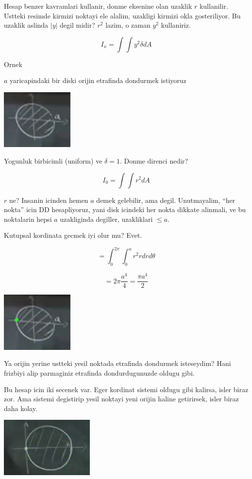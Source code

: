 \documentclass[12pt,fleqn]{article}\usepackage{../common}
\begin{document}
Hesap benzer kavramlari kullanir, donme eksenine olan uzaklik $r$
kullanilir. Ustteki resimde kirmizi noktayi ele alalim, uzakligi kirmizi
okla gosteriliyor. Bu uzaklik aslinda $|y|$ degil midir? $r^2$ lazim, o
zaman $y^2$ kullaniriz. 

\[ I_x = \int \int y^2 \delta dA \]

Ornek

$a$ yaricapindaki bir diski orijin etrafinda dondurmek istiyoruz 

\includegraphics[height=3cm]{17_7.png}

Yogunluk birbicimli (uniform) ve $\delta = 1$. Donme direnci nedir? 

\[ I_0 = \int \int r^2 dA \]

$r$ ne? Insanin icinden hemen $a$ demek gelebilir, ama degil. Unutmayalim,
``her nokta'' icin DD hesapliyoruz, yani disk icindeki her nokta dikkate
alinmali, ve bu noktalarin hepsi $a$ uzakliginda degiller, uzakliklari $\le
a$. 

Kutupsal kordinata gecmek iyi olur mu? Evet. 

\[ = \int_0^{2\pi} \int_0^a r^2 r dr d\theta \]


\[ = 2\pi \frac{a^4}{4} = \frac{\pi a^4}{2} \]

\includegraphics[height=3cm]{17_8.png}

Ya orijin yerine ustteki yesil noktada etrafinda dondurmek isteseydim? Hani
frizbiyi alip parmaginiz etrafinda dondurdugunuzde oldugu gibi. 

Bu hesap icin iki secenek var. Eger kordinat sistemi oldugu gibi kalirsa,
isler biraz zor. Ama sistemi degistirip yesil noktayi yeni orijin haline
getirirsek, isler biraz daha kolay. 

\includegraphics[height=3cm]{17_9.png}
\end{document}
